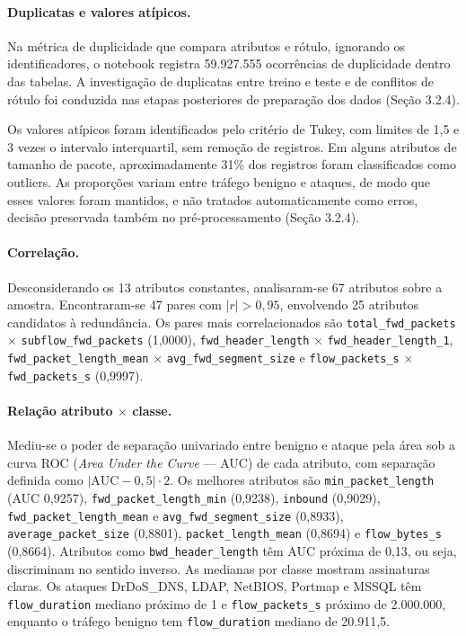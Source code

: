 \documentclass[
    12pt,                %
    openright,           %
    oneside,             %
    a4paper,             %
    english,             %
    brazil               %
]{abntex2}
\begin{document}
\paragraph{Duplicatas e valores atípicos.}
Na métrica de duplicidade que compara atributos e rótulo, ignorando os identificadores, o notebook registra 59.927.555 ocorrências de duplicidade dentro das tabelas. A investigação de duplicatas entre treino e teste e de conflitos de rótulo foi conduzida nas etapas posteriores de preparação dos dados (Seção 3.2.4).

Os valores atípicos foram identificados pelo critério de Tukey, com limites de 1,5 e 3 vezes o intervalo interquartil, sem remoção de registros. Em alguns atributos de tamanho de pacote, aproximadamente 31\% dos registros foram classificados como outliers. As proporções variam entre tráfego benigno e ataques, de modo que esses valores foram mantidos, e não tratados automaticamente como erros, decisão preservada também no pré-processamento (Seção 3.2.4).

\paragraph{Correlação.}
Desconsiderando os 13 atributos constantes, analisaram-se 67 atributos sobre a amostra. Encontraram-se 47 pares com $|r| > 0{,}95$, envolvendo 25 atributos candidatos à redundância. Os pares mais correlacionados são \texttt{total\_fwd\_packets} $\times$ \texttt{subflow\_fwd\_packets} (1,0000), \texttt{fwd\_header\_length} $\times$ \texttt{fwd\_header\_length\_1}, \texttt{fwd\_packet\_length\_mean} $\times$ \texttt{avg\_fwd\_segment\_size} e \texttt{flow\_packets\_s} $\times$ \texttt{fwd\_packets\_s} (0,9997).

\paragraph{Relação atributo $\times$ classe.}
Mediu-se o poder de separação univariado entre benigno e ataque pela área sob a curva ROC (\textit{Area Under the Curve} --- AUC) de cada atributo, com separação definida como $|\mathrm{AUC} - 0{,}5| \cdot 2$. Os melhores atributos são \texttt{min\_packet\_length} (AUC 0,9257), \texttt{fwd\_packet\_length\_min} (0,9238), \texttt{inbound} (0,9029), \texttt{fwd\_packet\_length\_mean} e \texttt{avg\_fwd\_segment\_size} (0,8933), \texttt{average\_packet\_size} (0,8801), \texttt{packet\_length\_mean} (0,8694) e \texttt{flow\_bytes\_s} (0,8664). Atributos como \texttt{bwd\_header\_length} têm AUC próxima de 0,13, ou seja, discriminam no sentido inverso. As medianas por classe mostram assinaturas claras. Os ataques DrDoS\_DNS, LDAP, NetBIOS, Portmap e MSSQL têm \texttt{flow\_duration} mediano próximo de 1 e \texttt{flow\_packets\_s} próximo de 2.000.000, enquanto o tráfego benigno tem \texttt{flow\_duration} mediano de 20.911,5.
\end{document}

